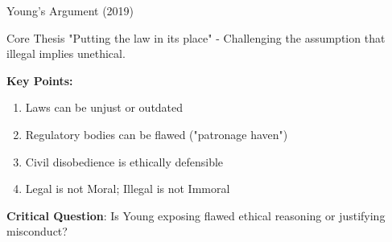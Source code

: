 \documentclass{beamer}
\begin{document}
	\begin{frame}{Young's Argument (2019)}
		\begin{block}{Core Thesis}
			"Putting the law in its place" - Challenging the assumption that illegal implies unethical.
		\end{block}
		
		\textbf{Key Points:}
		\begin{enumerate}
			\item Laws can be \textcolor{cfablue}{unjust} or \textcolor{cfablue}{outdated}
			\item Regulatory bodies can be flawed ("patronage haven")
			\item Civil disobedience is ethically defensible
			\item Legal is not Moral; Illegal is not Immoral
		\end{enumerate}
		
		\vspace{0.3cm}
		\textbf{Critical Question}: Is Young exposing flawed ethical reasoning or justifying misconduct?
	\end{frame}
	
\end{document}
